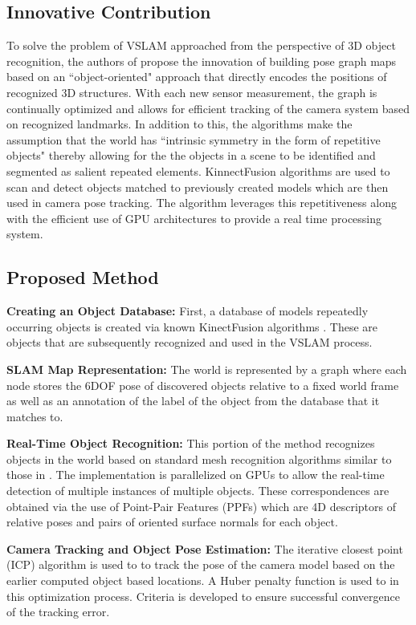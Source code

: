 \documentclass[10pt,twocolumn,letterpaper]{article}
\begin{document}
\subsection{Innovative Contribution}
To solve the problem of VSLAM approached from the perspective of 3D object recognition, the authors of \cite{Salas-Moreno_2013_CVPR} propose the innovation of building pose graph maps based on an ``object-oriented" approach that directly encodes the positions of recognized 3D structures. With each new sensor measurement, the graph is continually optimized and allows for efficient tracking of the camera system based on recognized landmarks. In addition to this, the algorithms make the assumption that the world has ``intrinsic symmetry in the form of repetitive objects" \cite{Salas-Moreno_2013_CVPR} thereby allowing for the the objects in a scene to be identified and segmented as salient repeated elements. KinnectFusion algorithms are used to scan and detect objects matched to previously created models which are then used in camera pose tracking. The algorithm leverages this repetitiveness along with the efficient use of GPU architectures to provide a real time processing system. 

\subsection{Proposed Method}
\textbf{Creating an Object Database:} First, a database of models repeatedly occurring objects is created via known KinectFusion algorithms \cite{kf11}. 
These are objects that are subsequently recognized and used in the VSLAM process. 

\textbf{SLAM Map Representation:} The world is represented by a graph where each node stores the 6DOF 
pose of discovered objects relative to a fixed world frame as well as an annotation of the label of the object from the database that it matches to.

\textbf{Real-Time Object Recognition:} This portion of the method recognizes objects in the world based on standard mesh recognition algorithms similar to those in \cite{drost6}. The implementation is parallelized on GPUs to allow the real-time detection of multiple instances of multiple objects. These correspondences are obtained via the use of Point-Pair Features (PPFs) which are 4D descriptors of relative poses and pairs of oriented surface normals for each object. 

\textbf{Camera Tracking and Object Pose Estimation:} The iterative closest point (ICP) algorithm \cite{icp15} is used to to track the pose of the camera model based on the earlier computed object based locations. A Huber penalty function is used to in this optimization process. Criteria is developed to ensure successful convergence of the tracking error.
\end{document}
